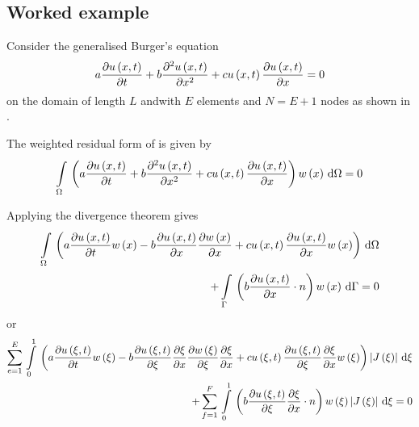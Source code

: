 \subsection{Worked example}

Consider the \onedal generalised Burger's equation
\begin{equation}
  a\delby{\fnof{u}{x,t}}{t}+b\deltwosqby{\fnof{u}{x,t}}{x}+c\fnof{u}{x,t}\delby{\fnof{u}{x,t}}{x}=0
  \label{eqn:onedgenburgersexample}
\end{equation}
on the \onedal domain of length $L$ andwith $E$ elements and $N=E+1$ nodes as shown in .


The weighted residual form of  is given by
\begin{equation}
  \gint{\Omega}{}{\pbrac{a\delby{\fnof{u}{x,t}}{t}+b\deltwosqby{\fnof{u}{x,t}}{x}+
      c\fnof{u}{x,t}\delby{\fnof{u}{x,t}}{x}}\fnof{w}{x}}{\Omega}=0
\end{equation}

Applying the divergence theorem gives
\begin{equation}
  \begin{split}
    \gint{\Omega}{}{\pbrac{a\delby{\fnof{u}{x,t}}{t}\fnof{w}{x}-b\delby{\fnof{u}{x,t}}{x}\delby{\fnof{w}{x}}{x}+
        c\fnof{u}{x,t}\delby{\fnof{u}{x,t}}{x}\fnof{w}{x}}}{\Omega}\\
    +\gint{\Gamma}{}{\pbrac{\dotprod{b\delby{\fnof{u}{x,t}}{x}}{n}}\fnof{w}{x}}{\Gamma}=0
  \end{split}
\end{equation}
or
\begin{equation}
  \begin{split}
    \gsum{e=1}{E}{\gint{0}{1}{\pbrac{a\delby{\fnof{u}{\xi,t}}{t}\fnof{w}{\xi}
          -b\delby{\fnof{u}{\xi,t}}{\xi}\delby{\xi}{x}\delby{\fnof{w}{\xi}}{\xi}\delby{\xi}{x}
          +c\fnof{u}{\xi,t}\delby{\fnof{u}{\xi,t}}{\xi}\delby{\xi}{x}\fnof{w}{\xi}}\abs{\fnof{J}{\xi}}}{\xi}} \\
    +\gsum{f=1}{F}{\gint{0}{1}{\pbrac{\dotprod{b\delby{\fnof{u}{\xi,t}}{\xi}\delby{\xi}{x}}{n}}\fnof{w}{\xi}
        \abs{\fnof{J}{\xi}}}{\xi}}=0
  \end{split}
\end{equation}

